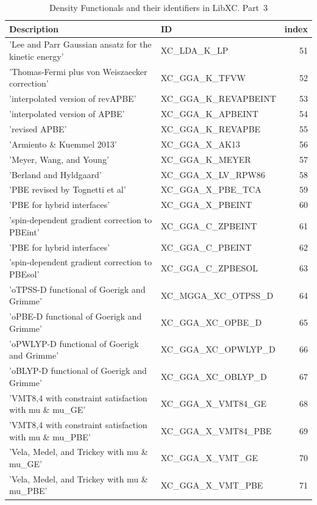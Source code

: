 \documentclass[final,12pt]{article}
\begin{document}
{{{{{{\begin{table}[!h]
\caption{Density Functionals and their identifiers in LibXC. Part~3}
\begin{center}
\begin{tabular}{llr}
\hline
\hline
Description & ID & index\\
\hline
  'Lee and Parr Gaussian ansatz for the kinetic energy' & XC\_LDA\_K\_LP  & 51\\
  'Thomas-Fermi plus von Weiszaecker correction' & XC\_GGA\_K\_TFVW  & 52\\
  'interpolated version of revAPBE' & XC\_GGA\_K\_REVAPBEINT  & 53\\
  'interpolated version of APBE' & XC\_GGA\_K\_APBEINT  & 54\\
  'revised APBE' & XC\_GGA\_K\_REVAPBE  & 55\\
  'Armiento \& Kuemmel 2013' & XC\_GGA\_X\_AK13  & 56\\
  'Meyer,  Wang, and Young' & XC\_GGA\_K\_MEYER  & 57\\
  'Berland and Hyldgaard' & XC\_GGA\_X\_LV\_RPW86  & 58\\
  'PBE revised by Tognetti et al' & XC\_GGA\_X\_PBE\_TCA  & 59\\
  'PBE for hybrid interfaces' & XC\_GGA\_X\_PBEINT  & 60\\
  'spin-dependent gradient correction to PBEint' & XC\_GGA\_C\_ZPBEINT  & 61\\
  'PBE for hybrid interfaces' & XC\_GGA\_C\_PBEINT  & 62\\
  'spin-dependent gradient correction to PBEsol' & XC\_GGA\_C\_ZPBESOL  & 63\\
  'oTPSS-D functional of Goerigk and Grimme' & XC\_MGGA\_XC\_OTPSS\_D  & 64\\
  'oPBE-D functional of Goerigk and Grimme' & XC\_GGA\_XC\_OPBE\_D  & 65\\
  'oPWLYP-D functional of Goerigk and Grimme' & XC\_GGA\_XC\_OPWLYP\_D  & 66\\
  'oBLYP-D functional of Goerigk and Grimme' & XC\_GGA\_XC\_OBLYP\_D  & 67\\
  'VMT{8,4} with constraint satisfaction with mu \& mu\_GE' & XC\_GGA\_X\_VMT84\_GE  & 68\\
  'VMT{8,4} with constraint satisfaction with mu \& mu\_PBE' & XC\_GGA\_X\_VMT84\_PBE  & 69\\
  'Vela, Medel, and Trickey with mu \& mu\_GE' & XC\_GGA\_X\_VMT\_GE  & 70\\
  'Vela, Medel, and Trickey with mu \& mu\_PBE' & XC\_GGA\_X\_VMT\_PBE  & 71\\

\end{tabular}
\end{center}
\end{table}}}}}}}
\end{document}
